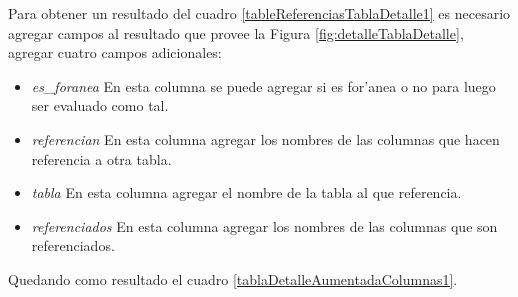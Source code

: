 Para obtener un resultado del cuadro \ref{tableReferenciasTablaDetalle1} es necesario agregar campos al resultado que provee la Figura \ref{fig:detalleTablaDetalle}, agregar cuatro campos adicionales:
\begin{itemize}
	\item \textit{es\_foranea} En esta columna se puede agregar si es for'anea o no para luego ser evaluado como tal.
	\item \textit{referencian} En esta columna agregar los nombres de las columnas que hacen referencia a otra tabla.
	\item \textit{tabla} En esta columna agregar el nombre de la tabla al que referencia.
	\item \textit{referenciados} En esta columna agregar los nombres de las columnas que son referenciados.
\end{itemize}
Quedando como resultado el cuadro \ref{tablaDetalleAumentadaColumnas1}.


